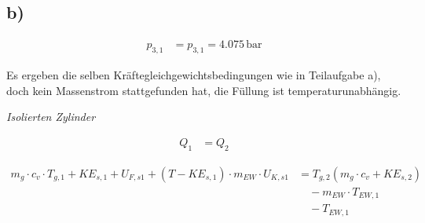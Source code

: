 

\subsection*{b)}
\begin{align*}
    p_{3,1} &= p_{3,1} = 4.075 \, \text{bar}
\end{align*}

Es ergeben die selben Kräftegleichgewichtsbedingungen wie in Teilaufgabe a), doch kein Massenstrom stattgefunden hat, die Füllung ist temperaturunabhängig.

\textit{Isolierten Zylinder}

\begin{align*}
    Q_1 &= Q_2
\end{align*}

\begin{align*}
    m_{g} \cdot c_v \cdot T_{g,1} + K E_{s,1} + U_{F,s1} + (T - K E_{s,1}) \cdot m_{EW} \cdot U_{K,s1} &= T_{g,2} \left( m_{g} \cdot c_v + K E_{s,2} \right) \\
    & \quad - m_{EW} \cdot T_{EW,1} \\
    & \quad - T_{EW,1}
\end{align*}